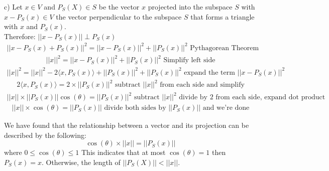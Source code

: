 \documentclass[12pt,twoside]{article}
\begin{document}
c) Let $x \in V$ and $P_S(X) \in S$ be the vector $x$ projected into the subspace $S$ with $x-P_S(x) \in V$ the vector perpendicular to the subspace $S$ that forms a triangle with $x$ and $P_S(x)$. \\
Therefore: $||x-P_S(x)|| \perp P_S(x)$ 
\begin{equation}
    \begin{split}
        ||x-P_S(x) + P_S(x)||^2 = ||x-P_S(x)||^2 + ||P_S(x)||^2 \text{ Pythagorean Theorem}
    \end{split}
\end{equation}
\begin{equation}
    \begin{split}
        ||x||^2 = ||x-P_S(x)||^2 + ||P_S(x)||^2 \text{ Simplify left side}
    \end{split}
\end{equation}
\begin{equation}
    \begin{split}
        ||x||^2 = ||x||^2  - 2\langle x, P_S(x)\rangle + ||P_S(x)||^2 + ||P_S(x)||^2  \text{ expand the term } ||x-P_S(x)||^2
    \end{split}
\end{equation}
\begin{equation}
    \begin{split}
        2\langle x, P_S(x)\rangle = 2 \times ||P_S(x)||^2  \text{ subtract } ||x||^2 \text{ from each side and simplify}
    \end{split}
\end{equation}
\begin{equation}
    \begin{split}
        ||x||\times ||P_S(x)|| \cos(\theta) = ||P_S(x)||^2  \text{ subtract } ||x||^2 \text{ divide by 2 from each side, expand dot product}
    \end{split}
\end{equation}
\begin{equation}
    \begin{split}
        ||x|| \times \cos(\theta) = ||P_S(x)||  \text{ divide both sides by } ||P_S(x)|| \text{ and we're done}
    \end{split}
\end{equation}

We have found that the relationship between a vector and its projection can be described by the following: 
$$\cos(\theta) \times ||x|| = ||P_S(x)||$$ where $0\leq \cos(\theta) \leq 1$
This indicates that at most $\cos (\theta) =1$ then $P_S(x) = x$. Otherwise, the length of $||P_S(X)|| < ||x||$.
\end{document}

